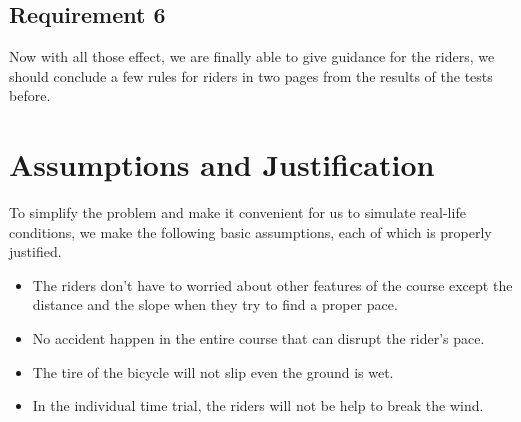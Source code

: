 \documentclass[12pt]{article}
\begin{document}
\subsection{Requirement 6}
Now with all those effect, we are finally able to give guidance for the riders, we should conclude a few rules for riders in two pages from the results of the tests before.
\section{Assumptions and Justification}

To simplify the problem and make it convenient for us to simulate real-life conditions, we make the following basic assumptions, each of which is properly justified.

\begin{itemize}
    \item The riders don't have to worried about other features of the course except the distance and the slope when they try to find a proper pace.
    \item No accident happen in the entire course that can disrupt the rider's pace.
    \item The tire of the bicycle will not slip even the ground is wet.
    \item In the individual time trial, the riders will not be help to break the wind.

\end{itemize}
\end{document}
